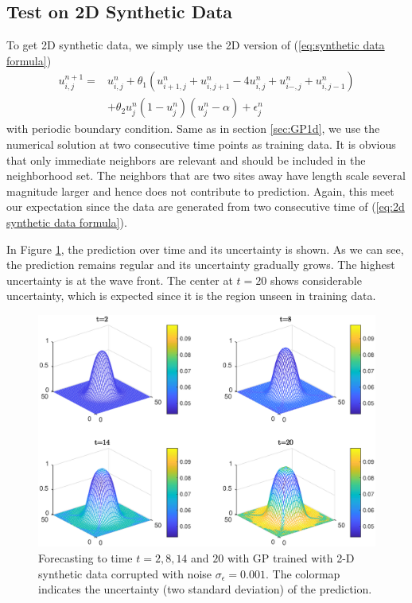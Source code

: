 \documentclass[11pt, reqno]{amsart}
\begin{document}
\subsection{Test on 2D Synthetic Data}
To get 2D synthetic data, we simply use the 2D version of (\ref{eq:synthetic data formula})
\begin{equation} \label{eq:2d synthetic data formula}
\begin{split}
u_{i,j}^{n+1}  = & u_{i,j}^{n}+\theta_{1}(u_{i+1,j}^{n}+u_{i,j+1}^{n}-4u_{i,j}^{n}+u_{i-,j}^{n}+u_{i,j-1}^{n}) \\
 &+\theta_{2}u_{j}^{n}(1-u_{j}^{n})(u_{j}^{n}-\alpha)+\epsilon_{j}^{n}
\end{split}
\end{equation}
with periodic boundary condition. Same as in section \ref{sec:GP1d}, we use the numerical solution at two consecutive time points as training data.   It is obvious that only immediate neighbors are relevant and should be included in the neighborhood set. The neighbors that are two sites away have length scale several magnitude larger and hence does not contribute to prediction. Again, this meet our expectation since the data are generated from two consecutive time of (\ref{eq:2d synthetic data formula}).     


In Figure \ref{fig:u subplot 2d}, the prediction over time and its uncertainty is shown. As we can see, the prediction remains regular and its uncertainty gradually grows. The highest uncertainty is at the wave front. The center at $t=20$ shows considerable uncertainty, which is expected since it is the region unseen in training data.    

\begin{figure}[h]
\centerline{\includegraphics[width=\textwidth]{chapterGP/figures/2d_u_surf_S_color}}
\caption[Forecasting to Time $t=2,8,14$ and $20$ with GP Trained with 2-D Synthetic Data]{\label{fig:u subplot 2d} Forecasting to time $t=2,8,14$ and $20$ with GP trained with 2-D synthetic data corrupted with noise $\sigma_{\epsilon}=0.001$. The colormap indicates the uncertainty (two standard deviation) of the prediction.}
\end{figure}
\end{document}
